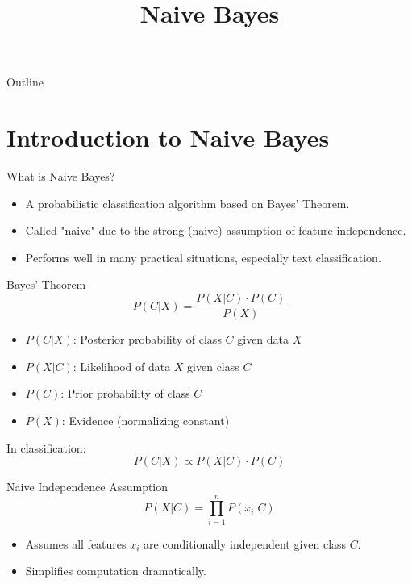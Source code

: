 \documentclass{beamer}
\title{Naive Bayes}
\subtitle{}
\date{}
\begin{document}
{
\begin{frame}
    \titlepage
\end{frame}
}
\begin{frame}{Outline}
    \tableofcontents
\end{frame}


\section{Introduction to Naive Bayes}
\begin{frame}{What is Naive Bayes?}
  \begin{itemize}
    \item A probabilistic classification algorithm based on Bayes’ Theorem.
    \item Called "naive" due to the strong (naive) assumption of feature independence.
    \item Performs well in many practical situations, especially text classification.
  \end{itemize}
\end{frame}

\begin{frame}{Bayes’ Theorem}
  \[
  P(C|X) = \frac{P(X|C) \cdot P(C)}{P(X)}
  \]
  \begin{itemize}
    \item $P(C|X)$: Posterior probability of class $C$ given data $X$
    \item $P(X|C)$: Likelihood of data $X$ given class $C$
    \item $P(C)$: Prior probability of class $C$
    \item $P(X)$: Evidence (normalizing constant)
  \end{itemize}
  In classification:
  \[
  P(C|X) \propto P(X|C) \cdot P(C)
  \]
\end{frame}

\begin{frame}{Naive Independence Assumption}
  \[
  P(X|C) = \prod_{i=1}^{n} P(x_i|C)
  \]
  \begin{itemize}
    \item Assumes all features $x_i$ are conditionally independent given class $C$.
    \item Simplifies computation dramatically.
  \end{itemize}
\end{frame}
\end{document}
